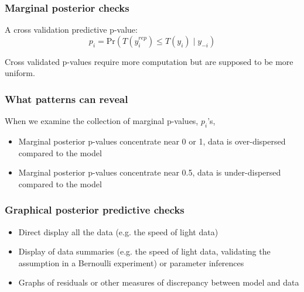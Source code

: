 \documentclass{beamer}
\begin{document}
\begin{frame}
  \frametitle{Marginal posterior checks}
A cross validation predictive p-value:
\[
p_i = \mbox{Pr}(T(y_i^{rep}) \leq T(y_i) \mid y_{-i})
\]   

Cross validated p-values require more computation but are supposed to
be more uniform.
\end{frame}

\begin{frame}
  \frametitle{What patterns can reveal }
  When we examine the collection of marginal p-values, $p_i$'s,
  \begin{itemize}
  \item Marginal posterior p-values concentrate near 0 or 1, data is
    over-dispersed compared to the model
  \item Marginal posterior p-values concentrate near 0.5, data is
    under-dispersed compared to the model 
  \end{itemize}
\end{frame}


\begin{frame}
  \frametitle{Graphical posterior predictive checks}
  \begin{itemize}
  \item Direct display all the data (e.g. the speed of light
    data)
\item Display of data summaries (e.g. the speed of light data,
  validating the assumption in a Bernoulli experiment) or parameter
  inferences
\item Graphs of residuals or other measures of discrepancy between
  model and data
  \end{itemize}
\end{frame}




\end{document}
